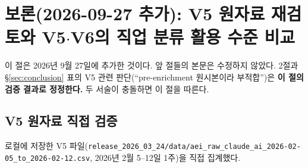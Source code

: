 \documentclass[11pt]{article}
\begin{document}
\section{보론(2026-09-27 추가): V5 원자료 재검토와 V5$\cdot$V6의 직업 분류 활용 수준 비교}
\label{sec:v5v6}

이 절은 2026년 9월 27일에 추가한 것이다. 앞 절들의 본문은 수정하지 않았다. 2절과 \S\ref{sec:conclusion} 표의 V5 관련 판단(``pre-enrichment 원시본이라 부적합'')은 \textbf{이 절의 검증 결과로 정정한다.} 두 서술이 충돌하면 이 절을 따른다.

\subsection{V5 원자료 직접 검증}

로컬에 저장한 V5 파일(\texttt{release\_2026\_03\_24/data/aei\_raw\_claude\_ai\_2026-02-05\_to\_2026-02-12.csv}, 2026년 2월 5--12일 1주)을 직접 집계했다.
\end{document}

